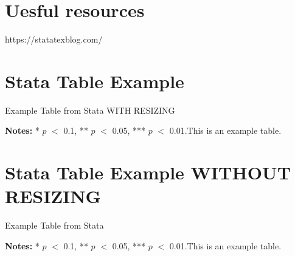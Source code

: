 \documentclass[11pt, a4paper, reqno]{article}
\begin{document}
\section{Uesful resources}

https://statatexblog.com/



\section{Stata Table Example}


\begin{table}[h!]
    \caption{Example Table from Stata WITH RESIZING}\label{tab:example1}
    \centering
    \resizebox{\textwidth}{!}{
    
    }
    \vspace{.25em}
    \caption*{\footnotesize \textbf{Notes:} * $p$ $<$ 0.1, ** $p$ $<$ 0.05, *** $p$ $<$ 0.01.This is an example table. }
\end{table}

\clearpage



\section{Stata Table Example WITHOUT RESIZING}
\begin{table}[h!]
    \caption{Example Table from Stata}\label{tab:example2}
    \centering
    
    \vspace{.25em}
    \caption*{\footnotesize \textbf{Notes:} * $p$ $<$ 0.1, ** $p$ $<$ 0.05, *** $p$ $<$ 0.01.This is an example table. }
\end{table}
\end{document}
